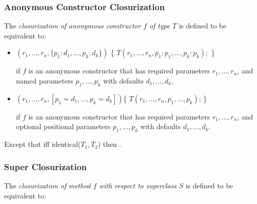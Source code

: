 \documentclass{article}
\newcommand{\code}[1]{{\sf #1}}
\begin{document}

\subsubsection{Anonymous Constructor Closurization}

\LMHash{}
The {\em closurization of anonymous constructor $f$ of type $T$} is defined to be equivalent to:
\begin{itemize}
\item  
\begin{dartCode}
$(r_1, \ldots, r_n, \{p_1 : d_1, \ldots , p_k : d_k\})$ \{
  \RETURN{} \NEW{} $T(r_1, \ldots, r_n, p_1: p_1, \ldots, p_k: p_k);$
\} 
\end{dartCode}

if $f$ is an anonymous constructor that has required parameters $r_1, \ldots, r_n$, and named parameters $p_1, \ldots, p_k$ with defaults $d_1, \ldots, d_k$.
\item 
\begin{dartCode}
$(r_1, \ldots, r_n, [p_1 = d_1, \ldots , p_k = d_k])$\{
  \RETURN{} \NEW{} $T(r_1, \ldots, r_n, p_1, \ldots, p_k)$;
\}
\end{dartCode}

if $f$ is an anonymous constructor that has required parameters $r_1, \ldots, r_n$, and optional positional parameters $p_1, \ldots, p_k$ with defaults $d_1, \ldots, d_k$.
\end{itemize}

\LMHash{}
Except that iff  \code{identical($T_1, T_2$)}  then  .


\subsubsection{Super Closurization}

\LMHash{}
The {\em closurization of method $f$ with respect to superclass $S$} is defined to be equivalent to:
\end{document}
